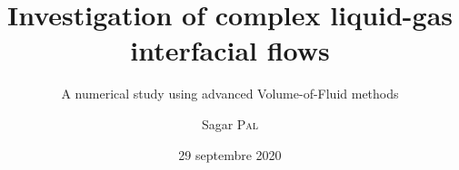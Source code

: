 \documentclass[
	fontsize=10pt, %
	twoside=false, %
	numbers=noenddot, %
]{kaobook}
\author{Sagar \textsc{Pal}}
\title{Investigation of complex liquid-gas interfacial flows}
\subtitle{A numerical study using advanced Volume-of-Fluid methods}
\date{29 septembre 2020}
\begin{document}
\pagedegarde


%
%
%
%
%


\frontmatter %


%
%

%

%
\end{document}
